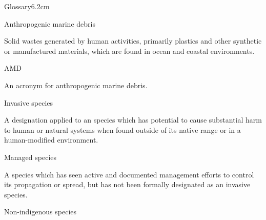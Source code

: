 \documentclass[a4paper, nobind]{templates/ociamthesis}
\begin{document}
\begin{romanpages}
  \dominitoc %

\flushbottom

\tableofcontents

\listoffigures
	\mtcaddchapter

\listoftables
  \mtcaddchapter
\begin{mclistof}{Glossary}{6.2cm}

\item[Anthropogenic marine debris]

Solid wastes generated by human activities, primarily plastics and other synthetic or manufactured materials, which are found in ocean and coastal environments.

\item[AMD]

An acronym for anthropogenic marine debris.

\item[Invasive species]

A designation applied to an species which has potential to cause substantial harm to human or natural systems when found outside of its native range or in a human-modified environment.

\item[Managed species]

A species which has seen active and documented management efforts to control its propagation or spread, but has not been formally designated as an invasive species.

\item[Non-indigenous species]


\end{mclistof}
\end{romanpages}
\end{document}
